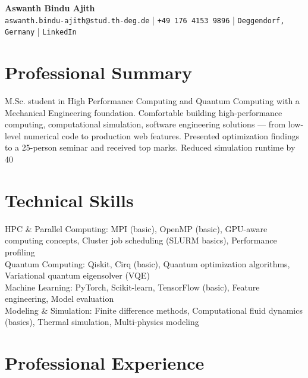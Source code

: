 \documentclass[11pt,a4paper]{article}
\begin{document}
\begin{center}
    {\LARGE\bfseries Aswanth Bindu Ajith}\\[4pt]
    \texttt{aswanth.bindu-ajith@stud.th-deg.de} | \texttt{+49 176 4153 9896} | \texttt{Deggendorf, Germany} | \texttt{LinkedIn}
\end{center}

\section{Professional Summary}
M.Sc. student in High Performance Computing and Quantum Computing with a Mechanical Engineering foundation. Comfortable building high-performance computing, computational simulation, software engineering solutions — from low-level numerical code to production web features. Presented optimization findings to a 25-person seminar and received top marks. Reduced simulation runtime by 40%

\section{Technical Skills}

HPC & Parallel Computing: MPI (basic), OpenMP (basic), GPU-aware computing concepts, Cluster job scheduling (SLURM basics), Performance profiling\\

Quantum Computing: Qiskit, Cirq (basic), Quantum optimization algorithms, Variational quantum eigensolver (VQE)\\

Machine Learning: PyTorch, Scikit-learn, TensorFlow (basic), Feature engineering, Model evaluation\\

Modeling & Simulation: Finite difference methods, Computational fluid dynamics (basics), Thermal simulation, Multi-physics modeling


\section{Professional Experience}
\end{document}

